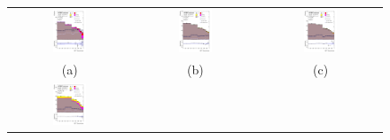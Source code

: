 \documentclass[PAPER, coverpage, atlasdraft=true, texlive=2016, UKenglish]{\ATLASLATEXPATH atlasdoc}
\begin{document}
\begin{figure}[H]
\begin{tabular}{@{}ccc@{}}
\includegraphics[width=0.29\textwidth]{figures/tuH_reg1l2tau1bnj_os.pdf}&
\includegraphics[width=0.29\textwidth]{figures/tuH_reg1l1tau1b1j_ss.pdf}&
\includegraphics[width=0.29\textwidth]{figures/tuH_reg1l1tau1b2j_ss.pdf}\\
(a)  & (b) & (c) \\
\includegraphics[width=0.29\textwidth]{figures/tuH_reg1l1tau1b2j_os.pdf}&

\end{tabular}
\end{figure}
\end{document}
